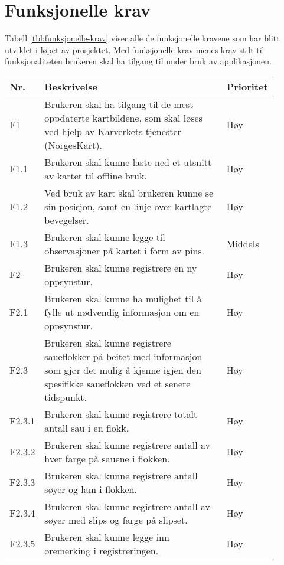 \section{Funksjonelle krav} \label{sec:funksjonelle-krav}
Tabell \ref{tbl:funksjonelle-krav} viser alle de funksjonelle kravene som har blitt utviklet i løpet av prosjektet. Med funksjonelle krav menes krav stilt til funksjonaliteten brukeren skal ha tilgang til under bruk av applikasjonen.
\begin{table}[H]
    \centering 
    \begin{tabular}{| p{0.1\linewidth} | p{0.7\linewidth} | p{0.1\linewidth} |}
       \hline
        Nr. & Beskrivelse & Prioritet \\
        \hline \hline
        F1 & Brukeren skal ha tilgang til de mest oppdaterte kartbildene, som skal løses ved hjelp av Karverkets tjenester (NorgesKart). & Høy \\ 
        \hline
        F1.1 & Brukeren skal kunne laste ned et utsnitt av kartet til offline bruk. & Høy \\ 
        \hline
        F1.2 & Ved bruk av kart skal brukeren kunne se sin posisjon, samt en linje over kartlagte bevegelser. & Høy \\
        \hline
        F1.3 & Brukeren skal kunne legge til observasjoner på kartet i form av pins. & Middels \\
        \hline
        F2 & Brukeren skal kunne registrere en ny oppsynstur. & Høy \\ 
        \hline
        F2.1 & Brukeren skal kunne ha mulighet til å fylle ut nødvendig informasjon om en oppsynstur. & Høy \\ 
        \hline
        F2.3 & Brukeren skal kunne registrere saueflokker på beitet med informasjon som gjør det mulig å kjenne igjen den spesifikke saueflokken ved et senere tidspunkt. & Høy \\
        \hline
        F2.3.1 & Brukeren skal kunne registrere totalt antall sau i en flokk. & Høy \\
        \hline
        F2.3.2 & Brukeren skal kunne registrere antall av hver farge på sauene i flokken. & Høy \\
        \hline
        F2.3.3 & Brukeren skal kunne registrere antall søyer og lam i flokken. & Høy \\
        \hline
        F2.3.4 & Brukeren skal kunne registrere antall av søyer med slips og farge på slipset. & Høy \\
        \hline    
        F2.3.5 & Brukeren skal kunne legge inn øremerking i registreringen. & Høy \\

\end{tabular}
\end{table}
